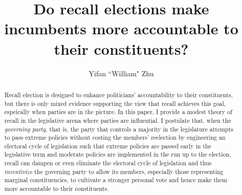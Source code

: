 \documentclass{article}
\title{Do recall elections make incumbents more accountable to their constituents?}
\author{Yifan ``William" Zhu}
\begin{document}
	\maketitle
	\begin{abstract}
		Recall election is designed to enhance politicians' accountability to their constituents,
		but there is only mixed evidence supporting the view that recall achieves this goal,
		espeically when parties are in the picture.
		In this paper,
		I provide a modest theory of recall
		in the legislative arena where parties are influential.
		I postulate that,
		when the \textit{governing party},
		that is, the party that controls a majority
		in the legislature
		attempts to pass extreme policies without costing the members' reelection
		by engineering an electoral cycle of legislation
		such that extreme policies are passed early in the legislative term
		and moderate policies are implemented in the run up to the election,
		recall
		can dampen or even eliminate the electoral cycle of legislation
		and thus \textit{incentivize} the governing party
		to allow its members,
		especially those representing marginal constituencies,
		to cultivate a stronger personal vote
		and hence make them more accountable to their constituents.
		
		
	\end{abstract}
	
\end{document}
